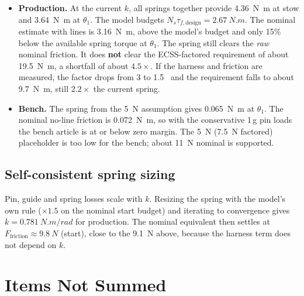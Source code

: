 \documentclass[11pt]{article}
\begin{document}
\begin{itemize}[nosep]
    \item \textbf{Production.} At the current $k$, all springs together provide \SI{4.36}{N.m} at stow
    and \SI{3.64}{N.m} at $\theta_1$. The model budgets $N_s\tau_{f,\text{design}}=\SI{2.67}{N.m}$. The
    nominal estimate with lines is \SI{3.16}{N.m}, above the model's budget and only 15\% below the
    available spring torque at $\theta_1$. The spring still clears the \emph{raw} nominal friction. It does
    \textbf{not} clear the ECSS-factored requirement of about \SI{19.5}{N.m}, a shortfall of about
    $4.5\times$. If the harness and friction are measured, the factor drops from 3 to 1.5~\cite{ecss} and the
    requirement falls to about \SI{9.7}{N.m}, still $2.2\times$ the current spring.
    \item \textbf{Bench.} The spring from the \SI{5}{N} assumption gives \SI{0.065}{N.m} at $\theta_1$. The
    nominal no-line friction is \SI{0.072}{N.m}, so with the conservative 1\,g pin loads the bench article
    is at or below zero margin. The \SI{5}{N} (\SI{7.5}{N} factored) placeholder is too low for the bench;
    about \SI{11}{N} nominal is supported.
\end{itemize}

\subsection*{Self-consistent spring sizing}
\label{sec:sc}
Pin, guide and spring losses scale with $k$. Resizing the spring with the model's own rule
($\times1.5$ on the nominal start budget) and iterating to convergence gives $k=\SI{0.781}{N.m/rad}$ for
production. The nominal equivalent then settles at $F_{\text{friction}} \approx \SI{9.8}{N}$ (start), close to
the \SI{9.1}{N} above, because the harness term does not depend on $k$.

\section{Items Not Summed}
\label{sec:unq}
\end{document}
